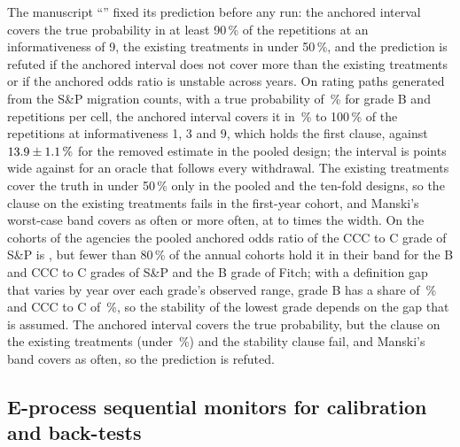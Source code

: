 The manuscript ``\pxPaperTitleFourteen{}'' fixed its prediction before any run: the anchored interval covers the true probability in at least 90\,\% of the repetitions at an informativeness of 9, the existing
treatments in under 50\,\%, and the prediction is refuted if the anchored interval does not cover more than the existing treatments or if the anchored odds ratio is unstable across years. On rating paths generated
from the S\&P migration counts, with a true probability of \pxPpFourteenTruthB{}\,\% for grade B and \pxPpFourteenReps{} repetitions per cell, the anchored interval covers it in \pxPpFourteenCovMin{}\,\% to 100\,\% of
the repetitions at informativeness 1, 3 and 9, which holds the first clause, against $13.9\pm1.1\,\%$ for the removed estimate in the pooled design; the interval is
\pxPpFourteenWidthAnchored{} points wide against \pxPpFourteenWidthFollowed{} for an oracle that follows every withdrawal. The existing treatments cover the truth in under 50\,\% only in the pooled and the ten-fold
designs, so the clause on the existing treatments fails in the first-year cohort, and Manski's worst-case band covers as often or more often, at \pxPpFourteenWidthManskiLo{} to \pxPpFourteenWidthManskiHi{} times the width. On the
cohorts of the agencies the pooled anchored odds ratio of the CCC to C grade of S\&P is \pxPpFourteenCccK{}, but fewer than 80\,\% of the annual cohorts hold it in their band for the B and CCC to C grades of
S\&P and the B grade of Fitch; with a definition gap that varies by year over each grade's observed range, grade B has a share of \pxPpFourteenShareB{}\,\% and CCC to C of \pxPpFourteenShareCcc{}\,\%, so the stability of the lowest grade
depends on the gap that is assumed. The anchored interval covers the true probability, but the clause on the existing treatments (under \pxFourteenExistingTarget{}\,\%) and the stability clause fail, and Manski's band covers as often, so the prediction is refuted.

\subsection{E-process sequential monitors for calibration and back-tests}
\label{sec:bs15}

